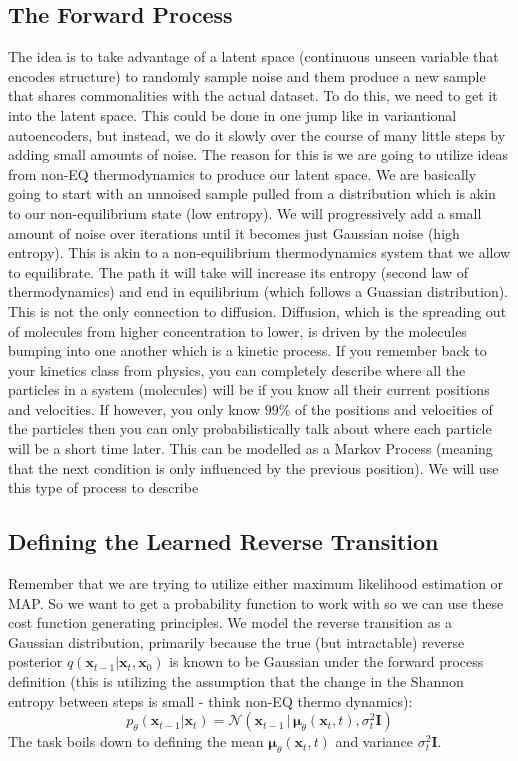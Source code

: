 \documentclass{article}
\newcommand{\bx}{\bm{x}}
\newcommand{\bmu}{\bm{\mu}}
\newcommand{\bI}{\mathbf{I}}
\begin{document}
\subsection{The Forward Process}
The idea is to take advantage of a latent space (continuous unseen variable that encodes structure) to randomly sample noise and them produce a new sample that shares commonalities with the actual dataset. To do this, we need to get it into the latent space. This could be done in one jump like in variantional autoencoders, but instead, we do it slowly over the course of many little steps by adding small amounts of noise. The reason for this is we are going to utilize ideas from non-EQ thermodynamics to produce our latent space. We are basically going to start with an unnoised sample pulled from a distribution which is akin to our non-equilibrium state (low entropy). We will progressively add a small amount of noise over iterations until it becomes just Gaussian noise (high entropy). This is akin to a non-equilibrium thermodynamics system that we allow to equilibrate. The path it will take will increase its entropy (second law of thermodynamics) and end in equilibrium (which follows a Guassian distribution). This is not the only connection to diffusion. Diffusion, which is the spreading out of molecules from higher concentration to lower, is driven by the molecules bumping into one another which is a kinetic process. If you remember back to your kinetics class from physics, you can completely describe where all the particles in a system (molecules) will be if you know all their current positions and velocities. If however, you only know $99\%$ of the positions and velocities of the particles then you can only probabilistically talk about where each particle will be a short time later. This can be modelled as a Markov Process (meaning that the next condition is only influenced by the previous position). We will use this type of process to describe 

\subsection{Defining the Learned Reverse Transition}

Remember that we are trying to utilize either maximum likelihood estimation or MAP. So we want to get a probability function to work with so we can use these cost function generating principles. We model the reverse transition as a Gaussian distribution, primarily because the true (but intractable) reverse posterior $q(\bx_{t-1}|\bx_t, \bx_0)$ is known to be Gaussian under the forward process definition (this is utilizing the assumption that the change in the Shannon entropy between steps is small - think non-EQ thermo dynamics):
\begin{equation}
    p_\theta(\bx_{t-1} | \bx_t) = \mathcal{N}(\bx_{t-1} \,|\, \bmu_\theta(\bx_t, t), \sigma_t^2 \bI)
\end{equation}
The task boils down to defining the mean $\bmu_\theta(\bx_t, t)$ and variance $\sigma_t^2 \bI$.
\end{document}
